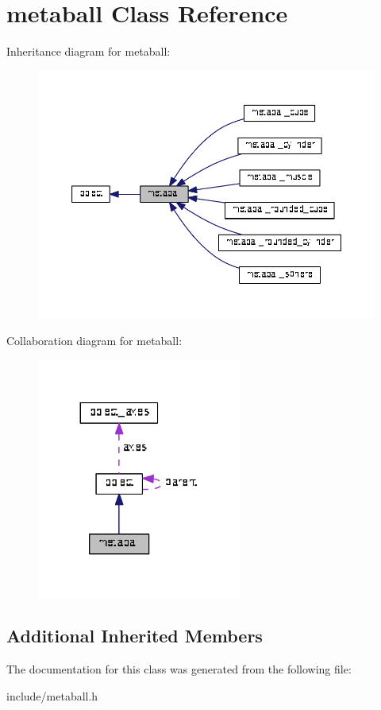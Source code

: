 \hypertarget{classmetaball}{}\section{metaball Class Reference}
\label{classmetaball}


Inheritance diagram for metaball\+:\nopagebreak
\begin{figure}[H]
\begin{center}
\leavevmode
\includegraphics[width=350pt]{classmetaball__inherit__graph}
\end{center}
\end{figure}


Collaboration diagram for metaball\+:\nopagebreak
\begin{figure}[H]
\begin{center}
\leavevmode
\includegraphics[width=191pt]{classmetaball__coll__graph}
\end{center}
\end{figure}
\subsection*{Additional Inherited Members}


The documentation for this class was generated from the following file\+:\begin{DoxyCompactItemize}
\item 
include/metaball.\+h\end{DoxyCompactItemize}
